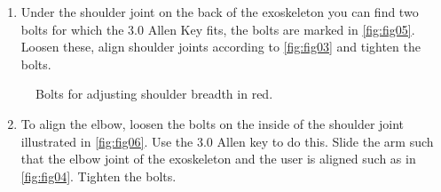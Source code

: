 \begin{enumerate}[]
	\item Under the shoulder joint on the back of the exoskeleton you can find two bolts for which the 3.0 Allen Key fits, the bolts are marked in \autoref{fig:fig05}. Loosen these, align shoulder joints according to \autoref{fig:fig03} and tighten the bolts. 
\end{enumerate}



\begin{figure}[H]
	\centering
	\begin{center}
	\end{center}
	\caption{Bolts for adjusting shoulder breadth in red.}
	\label{fig:fig05}
\end{figure}



\begin{enumerate}[]
	\setcounter{enumi}{1}
	\item To align the elbow, loosen the bolts on the inside of the shoulder joint illustrated in \autoref{fig:fig06}. Use the 3.0 Allen key to do this. Slide the arm such that the elbow joint of the exoskeleton and the user is aligned such as in \autoref{fig:fig04}. Tighten the bolts.
\end{enumerate}

